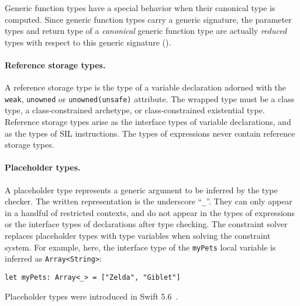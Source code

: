 \documentclass[../generics]{subfiles}
\begin{document}
Generic function types have a special behavior when their canonical type is computed. Since generic function types carry a generic signature, the parameter types and return type of a \emph{canonical} generic function type are actually \emph{reduced} types with respect to this generic signature ().

\paragraph{Reference storage types.}
A reference storage type is the type of a variable declaration adorned with the \texttt{weak}, \texttt{unowned} or \texttt{unowned(unsafe)} attribute. The wrapped type must be a class type, a class-constrained archetype, or class-constrained existential type. Reference storage types arise as the interface types of variable declarations, and as the types of SIL instructions. The types of expressions never contain reference storage types.

\paragraph{Placeholder types.}
A placeholder type represents a generic argument to be inferred by the type checker. The written representation is the underscore ``\verb|_|''. They can only appear in a handful of restricted contexts, and do not appear in the types of expressions or the interface types of declarations after type checking. The constraint solver replaces placeholder types with type variables when solving the constraint system. For example, here, the interface type of the \texttt{myPets} local variable is inferred as \texttt{Array<String>}:
\begin{Verbatim}
let myPets: Array<_> = ["Zelda", "Giblet"]
\end{Verbatim}
Placeholder types were introduced in Swift 5.6~\cite{se0315}.
\end{document}
